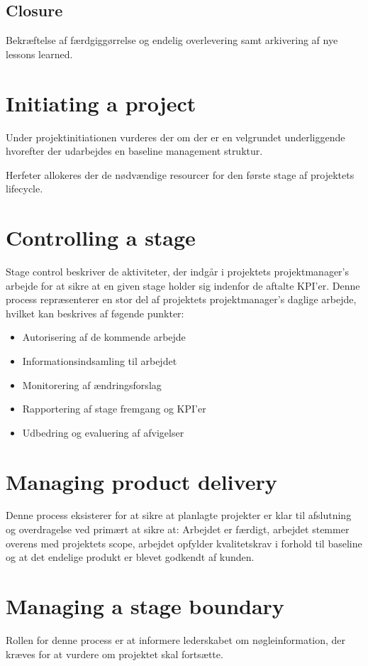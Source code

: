 \subsection{Closure}
Bekræftelse af færdgiggørrelse og endelig overlevering samt arkivering af nye lessons learned.

\section{Initiating a project}
Under projektinitiationen vurderes der om der er en velgrundet underliggende  hvorefter der udarbejdes en baseline management struktur. 

Herfeter allokeres der de nødvændige resourcer for den første stage af projektets lifecycle.

\section{Controlling a stage}
Stage control beskriver de aktiviteter, der indgår i projektets projektmanager's arbejde for at sikre at en given stage holder sig indenfor de aftalte KPI'er. Denne process repræsenterer en stor del af projektets projektmanager's daglige arbejde, hvilket kan beskrives af føgende punkter:

\begin{itemize}
    \item Autorisering af de kommende arbejde
    \item Informationsindsamling til arbejdet
    \item Monitorering af ændringsforslag
    \item Rapportering af stage fremgang og KPI'er
    \item Udbedring og evaluering af afvigelser
\end{itemize}

\section{Managing product delivery}
Denne process eksisterer for at sikre at planlagte projekter er klar til afslutning og overdragelse ved primært at sikre at: Arbejdet er færdigt, arbejdet stemmer overens med projektets scope, arbejdet opfylder kvalitetskrav i forhold til baseline og at det endelige produkt er blevet godkendt af kunden.

\section{Managing a stage boundary}
Rollen for denne process er at informere lederskabet om nøgleinformation, der kræves for at vurdere om projektet skal fortsætte.

